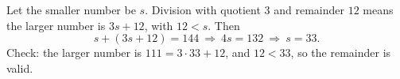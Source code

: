 Let the smaller number be $s$. Division with quotient $3$ and remainder $12$ means the larger number is $3s+12$, with $12<s$. Then
\[
s+(3s+12)=144\ \Longrightarrow\ 4s=132\ \Longrightarrow\ s=\boxed{33}.
\]
Check: the larger number is $111=3\cdot33+12$, and $12<33$, so the remainder is valid.
